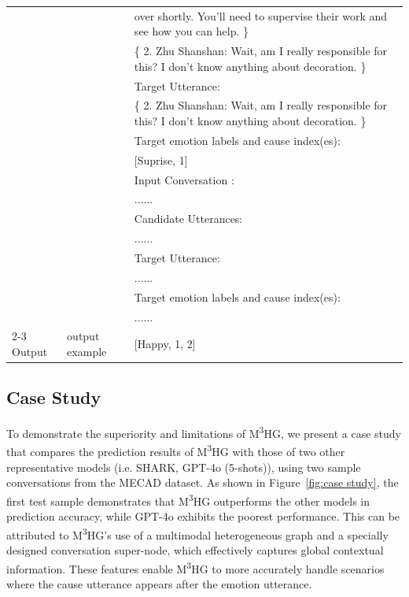 \documentclass[11pt]{article}
\begin{document}
\begin{table}[t]
\begin{tabular}{lll}
    & &  over shortly. You’ll need to supervise their work and see how you can help. \}\\
    & & \{ 2. Zhu Shanshan: Wait, am I really responsible for this? I don’t know anything about decoration. \} \\
    & & Target Utterance: \\
    & & \{ 2. Zhu Shanshan: Wait, am I really responsible for this? I don’t know anything about decoration. \} \\
    & & Target emotion labels and cause index(es): \\
    & & [Suprise, 1] \\
    & & Input Conversation : \\
    & & ...... \\
    & & Candidate Utterances: \\
    & & ...... \\
    & & Target Utterance: \\
    & & ...... \\
    & & Target emotion labels and cause index(es): \\
    & & ...... \\
    \cline{2-3}
     Output & output example & [Happy, 1, 2] \\
  \bottomrule
  \end{tabular}
\end{table}

\subsection{Case Study}

To demonstrate the superiority and limitations of M\textsuperscript{3}HG, we present a case study that compares the prediction results of M\textsuperscript{3}HG with those of two other representative models (i.e. SHARK, GPT-4o (5-shots)), using two sample conversations from the MECAD dataset. 
As shown in Figure~\ref{fig:case study}, the first test sample demonstrates that M\textsuperscript{3}HG outperforms the other models in prediction accuracy, while GPT-4o exhibits the poorest performance.
This can be attributed to M\textsuperscript{3}HG’s use of a multimodal heterogeneous graph and a specially designed conversation super-node, which effectively captures global contextual information. These features enable M\textsuperscript{3}HG to more accurately handle scenarios where the cause utterance appears after the emotion utterance.
\end{document}

